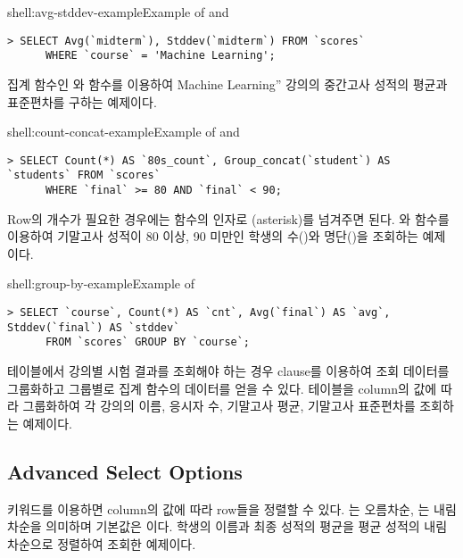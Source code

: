 \begin{shellenv}{shell:avg-stddev-example}{Example of  and }\begin{verbatim}
> SELECT Avg(`midterm`), Stddev(`midterm`) FROM `scores`
      WHERE `course` = 'Machine Learning';
\end{verbatim}
\end{shellenv}

\은 집계 함수인 와  함수를 이용하여 Machine Learning'' 강의의 중간고사 성적의 평균과 표준편차를 구하는 예제이다.

\begin{shellenv}{shell:count-concat-example}{Example of  and }
\begin{verbatim}
> SELECT Count(*) AS `80s_count`, Group_concat(`student`) AS `students` FROM `scores`
      WHERE `final` >= 80 AND `final` < 90;
\end{verbatim}
\end{shellenv}

Row의 개수가 필요한 경우에는  함수의 인자로 \cd{*}(asterisk)를 넘겨주면 된다. \은 와  함수를 이용하여 기말고사 성적이 80 이상, 90 미만인 학생의 수()와 명단()을 조회하는 예제이다.
\newpage

\begin{shellenv}{shell:group-by-example}{Example of }
\begin{verbatim}
> SELECT `course`, Count(*) AS `cnt`, Avg(`final`) AS `avg`, Stddev(`final`) AS `stddev`
      FROM `scores` GROUP BY `course`;
\end{verbatim}
\end{shellenv}

 테이블에서 강의별 시험 결과를 조회해야 하는 경우  clause를 이용하여 조회 데이터를 그룹화하고 그룹별로 집계 함수의 데이터를 얻을 수 있다. \은  테이블을  column의 값에 따라 그룹화하여 각 강의의 이름, 응시자 수, 기말고사 평균, 기말고사 표준편차를 조회하는 예제이다.

\subsection*{Advanced Select Options}

 키워드를 이용하면 column의 값에 따라 row들을 정렬할 수 있다. 는 오름차순, 는 내림차순을 의미하며 기본값은 이다. \은 학생의 이름과 최종 성적의 평균을 평균 성적의 내림차순으로 정렬하여 조회한 예제이다.

